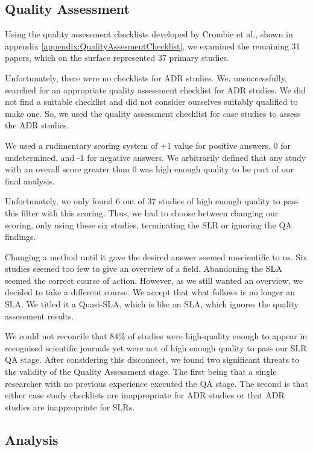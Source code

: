 \subsection{Quality Assessment}
Using the quality assessment checklists developed by Crombie et al.\cite{crombie1997pocket}, shown in appendix \ref{appendix:QualityAssesmentChecklist}, we examined the remaining 31 papers, which on the surface represented 37 primary studies.

Unfortunately, there were no checklists for ADR studies.
We, unsuccessfully, searched for an appropriate quality assessment checklist for ADR studies.
We did not find a suitable checklist and did not consider ourselves suitably qualified to make one.
So, we used the quality assessment checklist for case studies to assess the ADR studies.

We used a rudimentary scoring system of +1 value for positive answers, 0 for undetermined, and -1 for negative answers.
We arbitrarily defined that any study with an overall score greater than 0 was high enough quality to be part of our final analysis.

Unfortunately, we only found 6 out of 37 studies of high enough quality to pass this filter with this scoring.
Thus, we had to choose between changing our scoring, only using these six studies, terminating the SLR or ignoring the QA findings.

Changing a method until it gave the desired answer seemed unscientific to us.
Six studies seemed too few to give an overview of a field.
Abandoning the SLA seemed the correct course of action.
However, as we still wanted an overview, we decided to take a different course.
We accept that what follows is no longer an SLA. 
We titled it a Quasi-SLA, which is like an SLA, which ignores the quality assessment results.

We could not reconcile that 84\% of studies were high-quality enough to appear in recognised scientific journals yet were not of high enough quality to pass our SLR QA stage.
After considering this disconnect, we found two significant threats to the validity of the Quality Assessment stage.
The first being that a single researcher with no previous experience executed the QA stage.
The second is that either case study checklists are inappropriate for ADR studies or that ADR studies are inappropriate for SLRs.

\subsection{Analysis}

